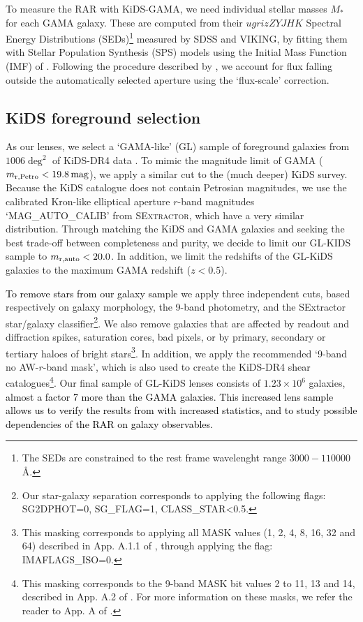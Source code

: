 \documentclass[usenatbib]{mnras}
\newcommand{\magn}{\, {\rm mag} }
\newcommand*{\E}[1]{\times 10^{#1}}
\newcommand{\un}[1]{_{\rm #1}}
\begin{document}
To measure the RAR with KiDS-GAMA, we need individual stellar masses $M_*$ for each GAMA galaxy. These are computed from their $ugrizZYJHK$ Spectral Energy Distributions (SEDs)\footnote{The SEDs are constrained to the rest frame wavelenght range $3000-110000$ \AA.} measured by SDSS and VIKING, by fitting them with \cite{bruzual2003} Stellar Population Synthesis (SPS) models using the Initial Mass Function (IMF) of \cite{chabrier2003}. Following the procedure described by \cite{taylor2011}, we account for flux falling outside the automatically selected aperture using the `flux-scale' correction.

\subsection{KiDS foreground selection}
\label{sec:gamalike_kids}

As our lenses, we select a `GAMA-like' (GL) sample of foreground galaxies from $1006 \deg^2$ of KiDS-DR4 data \cite[KiDS-1000,][]{kuijken2019}. To mimic the magnitude limit of GAMA ($m\un{r,Petro}<19.8 \magn$), we apply a similar cut to the (much deeper) KiDS survey. Because the KiDS catalogue does not contain Petrosian magnitudes, we use the calibrated Kron-like elliptical aperture $r$-band magnitudes `MAG\_AUTO\_CALIB' from \textsc{SExtractor}, which have a very similar distribution. Through matching the KiDS and GAMA galaxies and seeking the best trade-off between completeness and purity, we decide to limit our GL-KIDS sample to $m\un{r,auto}<20.0$. In addition, we limit the redshifts of the GL-KiDS galaxies to the maximum GAMA redshift ($z<0.5$).

\textcolor{black}{To remove stars from our galaxy sample} we apply three independent cuts, based respectively on galaxy morphology, the 9-band photometry, and the SExtractor star/galaxy classifier\footnote{Our star-galaxy separation corresponds to applying the following flags: SG2DPHOT=0, SG\_FLAG=1, CLASS\_STAR<0.5.}. We also remove galaxies that are affected by readout and diffraction spikes, saturation cores, bad pixels, or by primary, secondary or tertiary haloes of bright stars\footnote{This masking corresponds to applying all MASK values (1, 2, 4, 8, 16, 32 and 64) described in App. A.1.1 of \cite{kuijken2019}, through applying the flag: IMAFLAGS\_ISO=0.}. In addition, we apply the recommended `9-band no AW-$r$-band mask', which is also used to create the KiDS-DR4 shear catalogues\footnote{This masking corresponds to the 9-band MASK bit values 2 to 11, 13 and 14, described in App. A.2 of \cite{kuijken2019}. For more information on these masks, we refer the reader to App. A of \cite{kuijken2019}.}. Our final sample of GL-KiDS lenses consists of $1.23\E{6}$ galaxies, \textcolor{black}{almost a factor 7 more than the GAMA galaxies. This increased lens sample allows us to verify the results from \cite{brouwer2017} with increased statistics, and to study possible dependencies of the RAR on galaxy observables.}
\end{document}
